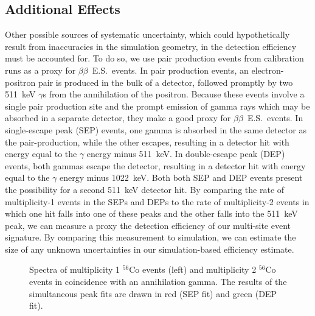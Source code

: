 \documentclass[notitlepage,rmp,aps,10pt]{revtex4-1}
\newcommand{\bb}{${\beta \beta}$}
\newcommand{\bbes}{\bb~E.S.}
\newcommand{\iso}[2]{$^{#1}$#2}
\newcommand{\Co}[1]{\iso{#1}{Co}}
\begin{document}
\subsection{Additional Effects} \label{sec:Co56}
Other possible sources of systematic uncertainty, which could hypothetically result from inaccuracies in the simulation geometry, in the detection efficiency must be accounted for.
To do so, we use pair production events from calibration runs as a proxy for \bbes\ events.
In pair production events, an electron-positron pair is produced in the bulk of a detector, followed promptly by two 511~keV $\gamma$s from the annihilation of the positron.
Because these events involve a single pair production site and the prompt emission of gamma rays which may be absorbed in a separate detector, they make a good proxy for \bbes\ events.
In single-escape peak (SEP) events, one gamma is absorbed in the same detector as the pair-production, while the other escapes, resulting in a detector hit with energy equal to the $\gamma$ energy minus 511~keV.
In double-escape peak (DEP) events, both gammas escape the detector, resulting in a detector hit with energy equal to the $\gamma$ energy minus 1022~keV.
Both both SEP and DEP events present the possibility for a second 511~keV detector hit.
By comparing the rate of multiplicity-1 events in the SEPs and DEPs to the rate of multiplicity-2 events in which one hit falls into one of these peaks and the other falls into the 511~keV peak, we can measure a proxy the detection efficiency of our multi-site event signature.
By comparing this measurement to simulation, we can estimate the size of any unknown uncertainties in our simulation-based efficiency estimate.
\\
\begin{figure}[ht]
  \centering
  \caption[Spectra of multiplicty 1 and 2 \Co{56} data with peak fits]{\label{fig:Co56Spectra}
    Spectra of multiplicity 1 \Co{56} events (left) and multiplicity 2 \Co{56} events in coincidence with an annihilation gamma. The results of the simultaneous peak fits are drawn in red (SEP fit) and green (DEP fit).
  }
\end{figure}
\end{document}
